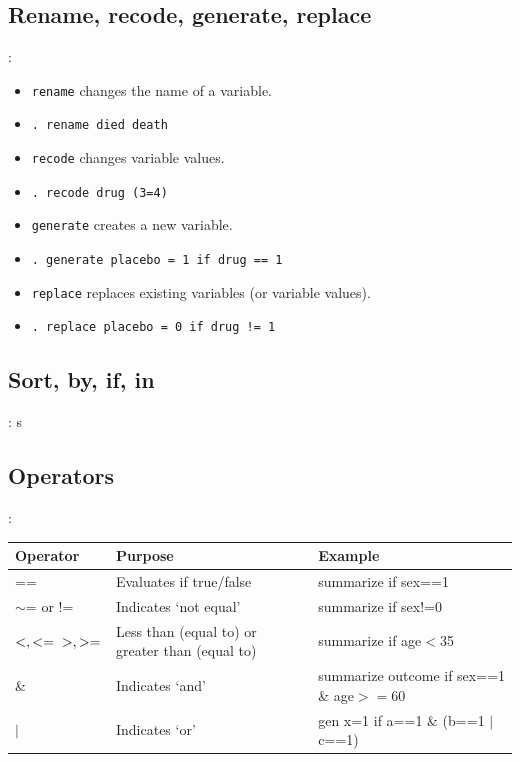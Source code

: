 \documentclass{beamer}
\begin{document}
\subsection{Rename, recode, generate, replace}
\begin{frame}[fragile]{\secname : \subsecname}
\begin{itemize}
\item 	\verb|rename| changes the name of a variable. 
\item[] \verb|. rename died death|
\item   \verb|recode| changes variable values.
\item[] \verb|. recode drug (3=4)|
\item   \verb|generate| creates a new variable.
\item[] \verb|. generate placebo = 1 if drug == 1|
\item   \verb|replace| replaces existing variables (or variable values).
\item[] \verb|. replace placebo = 0 if drug != 1|
\end{itemize}
\end{frame}

\subsection{Sort, by, if, in}
\begin{frame}[fragile]{\secname : \subsecname}
s
\end{frame}

\subsection{Operators}
\begin{frame}[fragile]{\secname : \subsecname}
\small
\begin{tabulary}{\textwidth}{LLL}
    \toprule
    \textbf{Operator} & \textbf{Purpose} & \textbf{Example} \\
    \midrule
    == & Evaluates if true/false & summarize if sex==1 \\
    $\sim$= or != & Indicates `not equal' & summarize if sex!=0 \\
    $< , <= \newline > , >=$ & Less than (equal to) or greater than (equal to) & summarize if age$<$35 \\
    \& & Indicates `and' & summarize outcome if sex==1 \& age$>=$60 \\
    $ \mid $ & Indicates `or' & gen x=1 if a==1 \& \newline (b==1 $\mid$ c==1) \\
\end{tabulary}
\end{frame}
\end{document}
